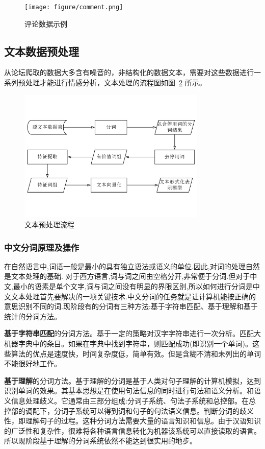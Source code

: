 \documentclass[cs4size,a4paper]{ctexart}
\numberwithin{equation}{section}
\numberwithin{table}{section}
\numberwithin{figure}{section}
\begin{document}
\begin{figure}
  \centering
  \texttt{[image: figure/comment.png]}
  \caption{评论数据示例}\label{fig:comment}
\end{figure}

\subsection{文本数据预处理}

从论坛爬取的数据大多含有噪音的，非结构化的数据文本，需要对这些数据进行一系列预处理才能进行情感分析，文本处理的流程图如图~\ref{fig:textPrecess} 所示。
\begin{figure}
  \centering
  \includegraphics[width=0.8\textwidth]{figure/textPrecess.pdf}
\caption{文本预处理流程}\label{fig:textPrecess}
\end{figure}

\subsubsection{中文分词原理及操作}

在自然语言中,词语一般是最小的具有独立语法或语义的单位.因此,对词的处理自然是文本处理的基础.
对于西方语言,词与词之间由空格分开,非常便于分词.但对于中文,最小的语素是单个文字,词与词之间没有明显的界限区别,所以如何进行分词是中文文本处理首先要解决的一项关键技术.中文分词的任务就是让计算机能按正确的意思识别不同的词.现阶段有的分词有三种方法:基于字符串匹配、基于理解和基于统计的分词方法。

\textbf{基于字符串匹配}的分词方法。基于一定的策略对汉字字符串进行一次分析。匹配大机器字典中的条目。如果在字典中找到字符串，则匹配成功(即识别一个单词)。这些算法的优点是速度快，时间复杂度低，简单有效。但是含糊不清和未列出的单词不能很好地工作。

\textbf{基于理解}的分词方法。基于理解的分词是基于人类对句子理解的计算机模拟，达到识别单词的效果。其基本思想是在使用句法信息的同时进行句法和语义分析。和语义信息处理歧义。它通常由三部分组成:分词子系统、句法子系统和总控部。在总控部的调配下，分词子系统可以得到词和句子的句法语义信息。判断分词的歧义性，即理解句子的过程。这种分词方法需要大量的语言知识和信息。由于汉语知识的广泛性和复杂性，很难将各种语言信息转化为机器该系统可以直接读取的语言。所以现阶段基于理解的分词系统依然不能达到很实用的地步。
\end{document}
